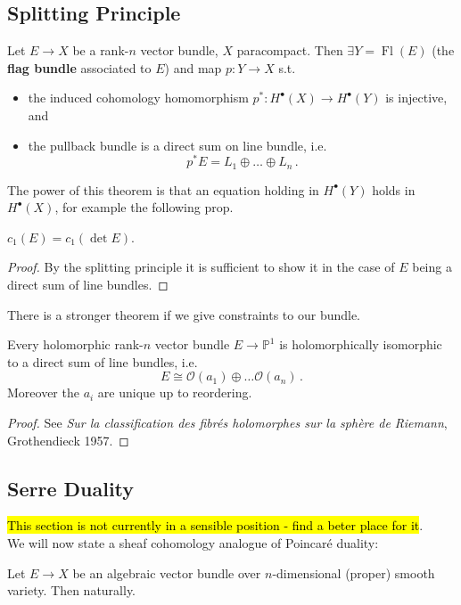 \documentclass{article}
\begin{document}
\subsection{Splitting Principle}

\begin{theorem}
	Let $E \to X$ be a rank-$n$ vector bundle, $X$ paracompact. Then $\exists Y = \operatorname{Fl}(E)$ (the \textbf{flag bundle} associated to $E$) and map $p:Y \to X$ s.t. 
	\begin{itemize}
		\item the induced cohomology homomorphism $p^\ast : H^\bullet(X) \to H^\bullet(Y)$ is injective, and 
		\item the pullback bundle is a direct sum on line bundle, i.e. 
		\[
		p^\ast E = L_1 \oplus \dots \oplus L_n \, .
		\]
	\end{itemize}
\end{theorem}
The power of this theorem is that an equation holding in $H^\bullet(Y)$ holds in $H^\bullet(X)$, for example the following prop.
\begin{prop}
	$c_1(E) = c_1(\det E)$. 
\end{prop}
\begin{proof}
	By the splitting principle it is sufficient to show it in the case of $E$ being a direct sum of line bundles. 
\end{proof}

 There is a stronger theorem if we give constraints to our bundle. 
\begin{theorem}
	Every holomorphic rank-$n$ vector bundle $E \to \mathbb{P}^1$ is holomorphically isomorphic to a direct sum of line bundles, i.e. 
	\[
	E \cong \mathcal{O}(a_1) \oplus \dots \mathcal{O}(a_n) \, .
	\]
	Moreover the $a_i$ are unique up to reordering. 
\end{theorem}
\begin{proof}
	See \emph{Sur la classification des fibrés holomorphes sur la sphère de Riemann}, Grothendieck 1957.
\end{proof}
\subsection{Serre Duality}
\hl{This section is not currently in a sensible position - find a beter place for it}.\\
We will now state a sheaf cohomology analogue of Poincar\'e duality:
\begin{theorem}
	Let $E \to X$ be an algebraic vector bundle over $n$-dimensional (proper) smooth variety. Then 
naturally. 
\end{theorem}
\end{document}
